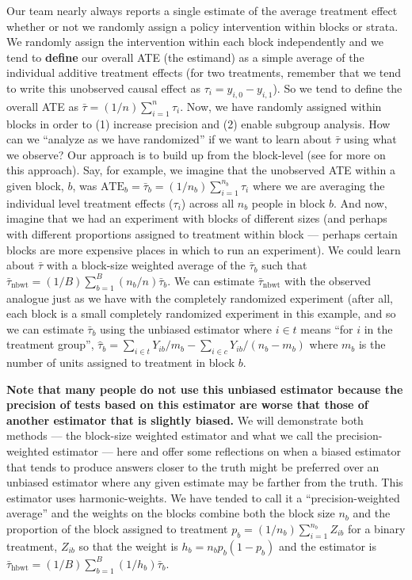 \documentclass[
  12pt,
]{book}
\theoremstyle{definition}
\theoremstyle{definition}
\theoremstyle{definition}
\theoremstyle{remark}
\begin{document}
Our team nearly always reports a single estimate of the average
treatment effect whether or not we randomly assign a policy intervention
within blocks or strata. We randomly assign the intervention within each
block independently and we tend to \textbf{define} our overall ATE (the
estimand) as a simple average of the individual additive treatment
effects (for two treatments, remember that we tend to write this
unobserved causal effect as \(\tau_i = y_{i,0} - y_{i,1}\)). So we tend
to define the overall ATE as \(\bar{\tau}=(1/n) \sum_{i=1}^n \tau_i\).
Now, we have randomly assigned within blocks in order to (1) increase
precision and (2) enable subgroup analysis. How can we ``analyze as we
have randomized'' if we want to learn about \(\bar{\tau}\) using what we
observe? Our approach is to build up from the block-level (see
\citet{gerber_field_2012} for more on this approach). Say, for example,
we imagine that the unobserved ATE within a given block, \(b\), was
\(\text{ATE}_{b}=\bar{\tau}_b=(1/n_b)\sum_{i=1}^{n_b} \tau_{i}\) where
we are averaging the individual level treatment effects (\(\tau_{i}\))
across all \(n_b\) people in block \(b\). And now, imagine that we had
an experiment with blocks of different sizes (and perhaps with different
proportions assigned to treatment within block --- perhaps certain
blocks are more expensive places in which to run an experiment). We
could learn about \(\bar{\tau}\) with a block-size weighted average of
the \(\bar{\tau}_b\) such that
\(\bar{\tau}_{\text{nbwt}}= (1/B) \sum_{b=1}^B (n_b/n) \bar{\tau}_b\).
We can estimate \(\bar{\tau}_{\text{nbwt}}\) with the observed analogue
just as we have with the completely randomized experiment (after all,
each block is a small completely randomized experiment in this example,
and so we can estimate \(\bar{\tau}_b\) using the unbiased estimator
where \(i \in t\) means ``for \(i\) in the treatment group'',
\(\hat{\tau}_b=\sum_{i \in t} Y_{ib}/m_b - \sum_{i \in c} Y_{ib}/(n_b - m_b)\)
where \(m_b\) is the number of units assigned to treatment in block
\(b\).

\textbf{Note that many people do not use this unbiased estimator because
the precision of tests based on this estimator are worse that those of
another estimator that is slightly biased.} We will demonstrate both
methods --- the block-size weighted estimator and what we call the
precision-weighted estimator --- here and offer some reflections on when
a biased estimator that tends to produce answers closer to the truth
might be preferred over an unbiased estimator where any given estimate
may be farther from the truth. This estimator uses harmonic-weights. We
have tended to call it a ``precision-weighted average'' and the weights
on the blocks combine both the block size \(n_b\) and the proportion of
the block assigned to treatment
\(p_b = (1/n_b) \sum_{i=1}^{n_b} Z_{ib}\) for a binary treatment,
\(Z_{ib}\) so that the weight is \(h_b = n_b p_b (1 - p_b)\) and the
estimator is
\(\bar{\tau}_{\text{hbwt}}= (1/B) \sum_{b=1}^B (1/h_b) \bar{\tau}_b\).
\end{document}
